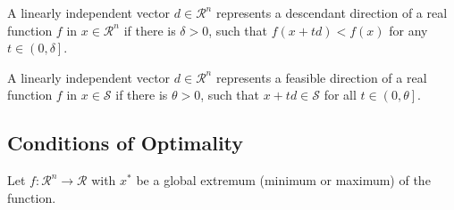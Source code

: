 \begin{enumerate}[i)]
\begin{defn} A linearly independent vector $d\in\mathcal{R}^{n}$ represents a descendant direction of a real function $f$ in $x\in\mathcal{R}^{n}$ if there is $\delta>0$, such that $f\left(x+t d\right)<f\left(x\right)$ for any $t\in\left.\left(0,\delta\right.\right]$.   
\end{defn}

\begin{defn} A linearly independent vector $d\in\mathcal{R}^{n}$ represents a feasible direction of a real function $f$ in $x\in\mathcal{S}$ if there is $\theta >0$, such that $x+t d\in \mathcal{S}$ for all $t\in\left.\left(0,\theta\right.\right]$.   
\end{defn}

\end{enumerate}

\subsection{Conditions of Optimality}\label{Chapter:GlobalOpt:Section:ConditionsOptimality}
Let $f:\mathcal{R}^{n}\rightarrow\mathcal{R}$ with $x^{\ast}$ be a global extremum (minimum or maximum) of the function.


